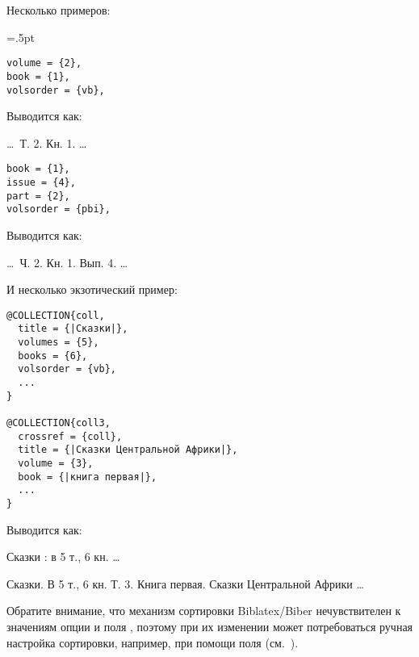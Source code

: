 \documentclass[10pt,a4paper,headings=small,numbers=enddot,english,russian]{ltxdockit}
\newcommand*{\biber}{Biber\xspace}
\newcommand*{\biblatex}{Biblatex\xspace}
\newenvironment{bibexample}{\begin{list}
     {}
     {\setlength{\leftmargin}{\parindent}%
      \setlength{\itemindent}{-\leftmargin}%
      \setlength{\parsep}{0pt}}}
  {\end{list}}
\begin{document}
Несколько примеров:

\bigskip

\columnseprule=.5pt
\raggedcolumns
\begin{multicols}{2}
\begin{lstlisting}[style=bibtex,escapechar=|]
volume = {2},
book = {1},
volsorder = {vb},
\end{lstlisting}
\columnbreak
Выводится как:
\begin{bibexample}
\item \ldots\ Т. 2. Кн. 1. \ldots
\end{bibexample}
\columnbreak
\end{multicols}

\bigskip

\begin{multicols}{2}
\begin{lstlisting}[style=bibtex,escapechar=|]
book = {1},
issue = {4},
part = {2},
volsorder = {pbi},
\end{lstlisting}
\columnbreak
Выводится как:%
\begin{bibexample}
\item \ldots\ Ч. 2. Кн. 1. Вып. 4. \ldots
\end{bibexample}
\columnbreak
\end{multicols}

\bigskip
И несколько экзотический пример:
\bigskip

\begin{multicols}{2}
\begin{lstlisting}[style=bibtex,escapechar=|]
@COLLECTION{coll,
  title = {|Сказки|},
  volumes = {5},
  books = {6},
  volsorder = {vb},
  ...
}

@COLLECTION{coll3,
  crossref = {coll},
  title = {|Сказки Центральной Африки|},
  volume = {3},
  book = {|книга первая|},
  ...
}
\end{lstlisting}
\columnbreak
Выводится как:
\begin{bibexample}
\item Сказки : в 5 т., 6 кн. \ldots
\item Сказки. В 5 т., 6 кн. Т. 3. Книга первая. Сказки Центральной Африки \ldots
\end{bibexample}
\end{multicols}

\bigskip
Обратите внимание, что механизм сортировки \biblatex\unspace\slash\biber
нечувствителен к значениям опции %
и поля , поэтому при их изменении может потребоваться ручная настройка
сортировки, например, при помощи поля  (см.~).
\end{document}
